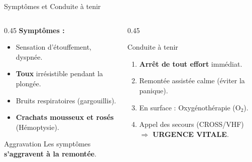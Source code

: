 \begin{frame}{Symptômes et Conduite à tenir}
  \begin{columns}[T]
    \begin{column}{0.45\textwidth}
      \textbf{Symptômes :}
      \begin{itemize}
        \item Sensation d'étouffement, dyspnée.
        \item \textbf{Toux} irrésistible pendant la plongée.
        \item Bruits respiratoires (gargouillis).
        \item \textbf{Crachats mousseux et rosés} (Hémoptysie).
      \end{itemize}
      
      \begin{alertblock}{Aggravation}
        Les symptômes \textbf{s'aggravent à la remontée}.
      \end{alertblock}
    \end{column}
    
    \begin{column}{0.45\textwidth}
      \begin{block}{Conduite à tenir}
        \begin{enumerate}
          \item \textbf{Arrêt de tout effort} immédiat.
          \item Remontée assistée calme (éviter la panique).
          \item En surface : Oxygénothérapie (O$_2$).
          \item Appel des secours (CROSS/VHF) $\Rightarrow$ \alert{\textbf{URGENCE VITALE}}.
        \end{enumerate}
      \end{block}
    \end{column}
  \end{columns}
\end{frame}